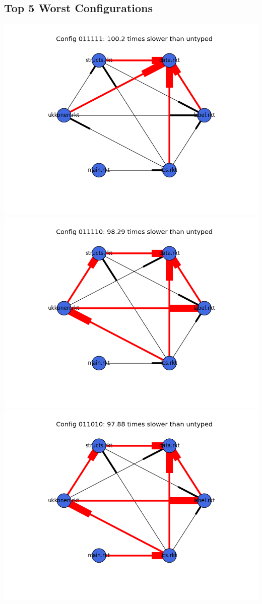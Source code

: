 \documentclass{article}
\begin{document}
\begin{itemize}
\subsection{Top 5 Worst Configurations}
\includegraphics[width=\textwidth]{suffixtree-2015-04-02-module-graph-011111.png}
\includegraphics[width=\textwidth]{suffixtree-2015-04-02-module-graph-011110.png}
\includegraphics[width=\textwidth]{suffixtree-2015-04-02-module-graph-011010.png}

\end{itemize}
\end{document}
